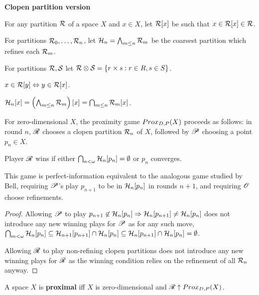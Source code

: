 \newpage

\centerline{\bf Clopen partition version}

\begin{definition}
  For any partition $\mathcal{R}$ of a space $X$ and $x\in X$, let $\mathcal{R}[x]$ be such that $x\in\mathcal{R}[x]\in\mathcal{R}$.

  For partitions $\mathcal{R}_0,\dots,\mathcal{R}_n$, let $\mathcal{H}_n=\bigwedge_{m\leq n} \mathcal{R}_m$ be the coarsest partition which refines each $\mathcal{R}_m$.

  For partitions $\mathcal{R},\mathcal{S}$ let $\mathcal{R}\otimes \mathcal{S} = \{r\times s: r\in R, s\in S\}$.
\end{definition}

\begin{proposition}
  $x\in \mathcal{R}[y] \Leftrightarrow y\in \mathcal{R}[x]$.

  $\mathcal{H}_n[x]=\left(\bigwedge_{m\leq n} \mathcal{R}_m\right)[x]=\bigcap_{m\leq n}\mathcal{R}_m[x]$.
\end{proposition}

\begin{definition}
  For zero-dimensional $X$, the proximity game $Prox_{D,P}(X)$ proceeds as follows: in round $n$, $\mathscr{R}$ chooses a clopen partition $\mathcal{R}_n$ of $X$, followed by $\mathscr{P}$ choosing a point $p_n\in X$.

  Player $\mathscr{R}$ wins if either $\bigcap_{n<\omega} \mathcal{H}_n[p_n] = \emptyset$ or $p_n$ converges.
\end{definition}

\begin{proposition}
  This game is perfect-information equivalent to the analogous game studied by Bell, requiring $\mathscr{P}$'s play $p_{n+1}$ to be in $\mathcal{H}_n[p_n]$ in rounds $n+1$, and requiring $\mathscr{O}$ choose refinements.
\end{proposition}

\begin{proof}
  Allowing $\mathscr{P}$ to play $p_{n+1}\not\in \mathcal{H}_n[p_n]\Rightarrow \mathcal{H}_n[p_{n+1}]\not=\mathcal{H}_n[p_n]$ does not introduce any new winning plays for $\mathscr{P}$ as for any such move, $\bigcap_{m<\omega}\mathcal{H}_n[p_n]\subseteq \mathcal{H}_{n+1}[p_{n+1}]\cap \mathcal{H}_n[p_n]\subseteq \mathcal{H}_n[p_{n+1}]\cap \mathcal{H}_n[p_n]=\emptyset$.

  Allowing $\mathscr{R}$ to play non-refining clopen partitions does not introduce any new winning plays for $\mathscr{R}$ as the winning condition relies on the refinement of all $\mathcal{R}_n$ anyway.
\end{proof}

\begin{definition}
  A space $X$ is \textbf{proximal} iff $X$ is zero-dimensional and $\mathscr{R}\uparrow Prox_{D,P}(X)$.
\end{definition}

